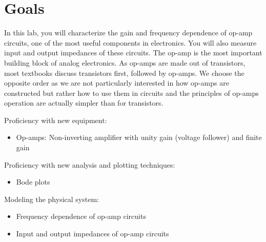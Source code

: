 \documentclass[10pt]{PhysLab1C} %
\begin{document}
\maketitle %


\thispagestyle{firstpage} %


\section{Goals}

In this lab, you will characterize the gain and frequency dependence of
op-amp circuits, one of the most useful components in electronics. You
will also measure input and output impedances of these circuits. The
op-amp is the most important building block of analog electronics. As
op-amps are made out of transistors, most textbooks discuss transistors
first, followed by op-amps. We choose the opposite order as we are not
particularly interested in how op-amps are constructed but rather how to
use them in circuits and the principles of op-amps operation are
actually simpler than for transistors.

Proficiency with new equipment:

\begin{itemize}
\item
  Op-amps: Non-inverting amplifier with unity gain (voltage follower)
  and finite gain
\end{itemize}

Proficiency with new analysis and plotting techniques:

\begin{itemize}
\item
  Bode plots
\end{itemize}

Modeling the physical system:

\begin{itemize}
\item
  Frequency dependence of op-amp circuits
\item
  Input and output impedances of op-amp circuits
\end{itemize}
\end{document}
